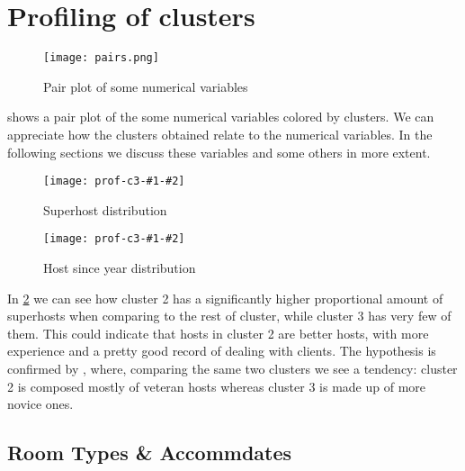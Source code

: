
\section{Profiling of clusters}%
\label{sec:profiling_of_clusters}

\newcommand{\profiling}[3]{
\begin{figure}[H]
    \centering
    \texttt{[image: prof-c3-\#1-\#2]}
    \caption{#3}%
    \label{fig:prof-#1-#2}
\end{figure}
}

\begin{figure}[H]
    \centering
    \texttt{[image: pairs.png]}
    \caption{Pair plot of some numerical variables}%
    \label{fig:pair}
\end{figure}

 shows a pair plot of the some numerical variables colored by clusters. We
can appreciate how the clusters
obtained relate to the numerical variables. In the following sections we discuss
these variables and some others in more extent.


\pagebreak

\profiling{host_is_superhost}{side}{Superhost distribution}
\profiling{host_since_year}{percent}{Host since year distribution}
In \cref{fig:prof-host_is_superhost-side} we can see how cluster 2 has a significantly higher proportional amount of superhosts when comparing to the rest of cluster, while cluster 3 has very few of them. This could indicate that hosts in cluster 2 are better hosts, with more experience and a pretty good record of dealing with clients. The hypothesis is confirmed by , where, comparing the same two clusters we see a tendency: cluster 2 is composed mostly of veteran hosts whereas cluster 3 is made up of more novice ones.




\clearpage
\subsection{Room Types \& Accommdates}%





